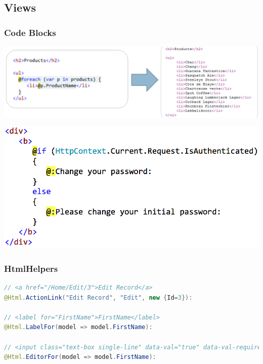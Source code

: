 \documentclass[10pt]{article}
\begin{document}
\subsection{Views}
\subsubsection{Code Blocks	}
\begin{center}
	\includegraphics[scale=0.3]{mvc_views_at.png}
\end{center}
\begin{center}
	\includegraphics[scale=0.2]{mvc_views_at_break.png}
\end{center}
\subsubsection{HtmlHelpers}
\begin{lstlisting}[language=Java, caption=typed view:, style=JavaStyle]
// <a href="/Home/Edit/3">Edit Record</a>
@Html.ActionLink("Edit Record", "Edit", new {Id=3}):

// <label for="FirstName">FirstName</label>
@Html.LabelFor(model => model.FirstName):

// <input class="text-box single-line" data-val="true" data-val-required="The FirstName field is required." id="FirstName" name="FirstName" type="text" value="" />
@Html.EditorFor(model => model.FirstName):
\end{lstlisting}
\end{document}
